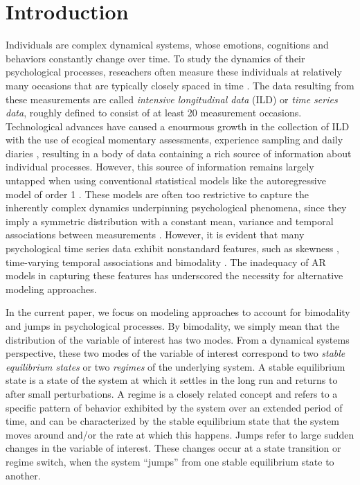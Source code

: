 \documentclass{article}
\begin{document}
\section{Introduction}
Individuals are complex dynamical systems, whose emotions, cognitions and behaviors constantly change over time.
To study the dynamics of their psychological processes, reseachers often measure these individuals at relatively many occasions that are typically closely spaced in time \citep{bolger2013intensive, walls2006models}.
The data resulting from these measurements are called \textit{intensive longitudinal data} (ILD) or \textit{time series data}, roughly defined to consist of at least 20 measurement occasions.
Technological advances have caused a enourmous growth in the collection of ILD with the use of ecogical momentary assessments, experience sampling and daily diaries \citep{notimelikethepresent}, resulting in a body of data containing a rich source of information about individual processes.
However, this source of information remains largely untapped when using conventional statistical models like the autoregressive model of order 1 \citep[AR(1)][]{box_jenkins, chatfield}. These models are often too restrictive to capture the inherently complex dynamics underpinning psychological phenomena, since they imply a symmetric distribution with a constant mean, variance and temporal associations between measurements \citep{formal_theory_1, changing_inertia_2}.
However, it is evident that many psychological time series data exhibit nonstandard features, such as skewness \citep{skewness_oisin, skewness_2, skewness_3}, time-varying temporal associations \citep{changing_inertia_1, changing_inertia_2} and bimodality \citep{skewness_oisin, bimodality_han}.
The inadequacy of AR models in capturing these features has underscored the necessity for alternative modeling approaches.

In the current paper, we focus on modeling approaches to account for bimodality and jumps in psychological processes.
By bimodality, we simply mean that the distribution of the variable of interest has two modes.
From a dynamical systems perspective, these two modes of the variable of interest correspond to two \textit{stable equilibrium states} or two \textit{regimes} of the underlying system.
A stable equilibrium state is a state of the system at which it settles in the long run and returns to after small perturbations.
A regime is a closely related concept and refers to a specific pattern of behavior exhibited by the system over an extended period of time, and can be characterized by the stable equilibrium state that the system moves around and/or the rate at which this happens.
Jumps refer to large sudden changes in the variable of interest.
These changes occur at a state transition or regime switch, when the system ``jumps'' from one stable equilibrium state to another.
\end{document}
